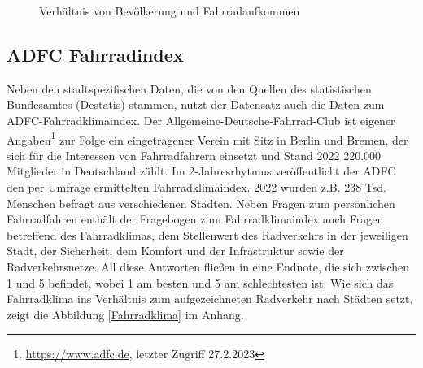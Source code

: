 \documentclass[a4paper,12pt]{thesis}
\begin{document}
\begin{figure}[!ht]%
	\centering
	\qquad
	\caption{Verhältnis von Bevölkerung und Fahrradaufkommen}%
	\label{fig:PKSundAusl}%
\end{figure}

\subsection{ADFC Fahrradindex}

Neben den stadtspezifischen Daten, die von den Quellen des statistischen Bundesamtes (Destatis) stammen, nutzt der Datensatz auch die Daten zum ADFC-Fahrradklimaindex. Der Allgemeine-Deutsche-Fahrrad-Club ist eigener Angaben\footnote{\url{https://www.adfc.de}, letzter Zugriff 27.2.2023} zur Folge ein eingetragener Verein mit Sitz in Berlin und Bremen, der sich für die Interessen von Fahrradfahrern einsetzt und Stand 2022 220.000 Mitglieder in Deutschland zählt. Im 2-Jahresrhytmus veröffentlicht der ADFC den per Umfrage ermittelten Fahrradklimaindex. 2022 wurden z.B. 238 Tsd. Menschen befragt aus verschiedenen Städten. Neben Fragen zum persönlichen Fahrradfahren enthält der Fragebogen zum Fahrradklimaindex auch Fragen betreffend des Fahrradklimas, dem Stellenwert des Radverkehrs in der jeweiligen Stadt, der Sicherheit, dem Komfort und der Infrastruktur sowie der Radverkehrsnetze. All diese Antworten fließen in eine Endnote, die sich zwischen 1 und 5 befindet, wobei 1 am besten und 5 am schlechtesten ist. Wie sich das Fahrradklima ins Verhältnis zum aufgezeichneten Radverkehr nach Städten setzt, zeigt die Abbildung \ref{Fahrradklima} im Anhang.
\end{document}
